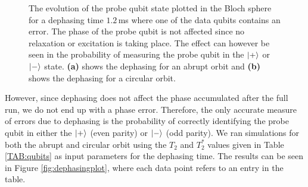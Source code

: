 \begin{figure}[H]
	\caption[oddeven]{The evolution of the probe qubit state plotted in the Bloch sphere for a dephasing time $1.2\, $ms where one of the data qubits contains an error. The phase of the probe qubit is not affected since no relaxation or excitation is taking place. The effect can however be seen in the probability of measuring the probe qubit in the $\ket{+}$ or $\ket{-}$ state. \textbf{(a)} shows the dephasing for an abrupt orbit and \textbf{(b)} shows the dephasing for a circular orbit.}
	\label{FIG:deph}
\end{figure}


However, since dephasing does not affect the phase accumulated after the full run, we do not end up with a phase error. Therefore, the only accurate measure of errors due to dephasing is the probability of correctly identifying the probe qubit in either the $\ket{+}$ (even parity) or $\ket{-}$ (odd parity). We ran simulations for both the abrupt and circular orbit using the $T_2$ and $T_2^*$ values given in Table \ref{TAB:qubits} as input parameters for the dephasing time. The results can be seen in Figure \ref{fig:dephasingplot}, where each data point refers to an entry in the table. 

